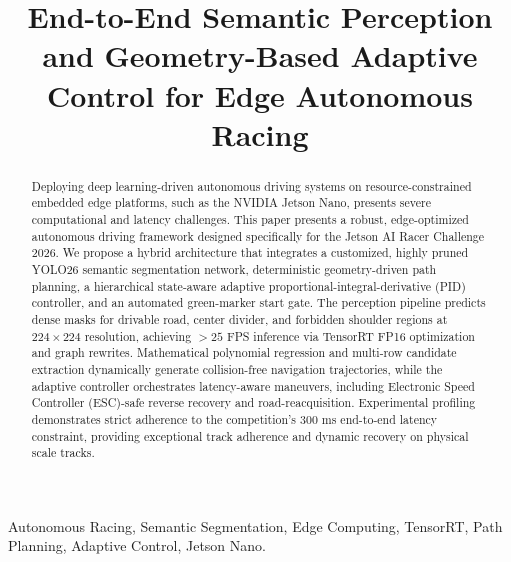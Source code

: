 \documentclass[conference]{IEEEtran}
\begin{document}
\title{End-to-End Semantic Perception and Geometry-Based Adaptive Control for Edge Autonomous Racing\\}

\author{
    \and
    \and
}

\maketitle

\begin{abstract}
    Deploying deep learning-driven autonomous driving systems on resource-constrained embedded edge platforms, such as the NVIDIA Jetson Nano, presents severe computational and latency challenges. This paper presents a robust, edge-optimized autonomous driving framework designed specifically for the Jetson AI Racer Challenge 2026. We propose a hybrid architecture that integrates a customized, highly pruned YOLO26 semantic segmentation network, deterministic geometry-driven path planning, a hierarchical state-aware adaptive proportional-integral-derivative (PID) controller, and an automated green-marker start gate. The perception pipeline predicts dense masks for drivable road, center divider, and forbidden shoulder regions at $224 \times 224$ resolution, achieving $>25$ FPS inference via TensorRT FP16 optimization and graph rewrites. Mathematical polynomial regression and multi-row candidate extraction dynamically generate collision-free navigation trajectories, while the adaptive controller orchestrates latency-aware maneuvers, including Electronic Speed Controller (ESC)-safe reverse recovery and road-reacquisition. Experimental profiling demonstrates strict adherence to the competition's 300 ms end-to-end latency constraint, providing exceptional track adherence and dynamic recovery on physical scale tracks.
\end{abstract}

\begin{IEEEkeywords}
    Autonomous Racing, Semantic Segmentation, Edge Computing, TensorRT, Path Planning, Adaptive Control, Jetson Nano.
\end{IEEEkeywords}
\end{document}
